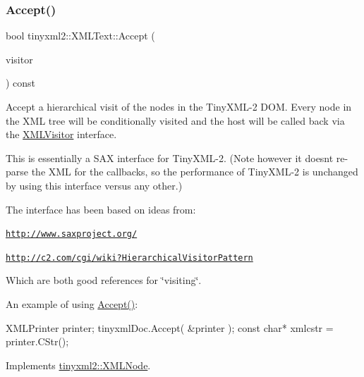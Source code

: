 \subsubsection{\texorpdfstring{Accept()}{Accept()}}
{\footnotesize\ttfamily bool tinyxml2\+::\+X\+M\+L\+Text\+::\+Accept (\begin{DoxyParamCaption}\item[{\hyperlink{classtinyxml2_1_1_x_m_l_visitor}{X\+M\+L\+Visitor} $\ast$}]{visitor }\end{DoxyParamCaption}) const\hspace{0.3cm}{\ttfamily [virtual]}}

Accept a hierarchical visit of the nodes in the Tiny\+X\+M\+L-\/2 D\+OM. Every node in the X\+ML tree will be conditionally visited and the host will be called back via the \hyperlink{classtinyxml2_1_1_x_m_l_visitor}{X\+M\+L\+Visitor} interface.

This is essentially a S\+AX interface for Tiny\+X\+M\+L-\/2. (Note however it doesn\textquotesingle{}t re-\/parse the X\+ML for the callbacks, so the performance of Tiny\+X\+M\+L-\/2 is unchanged by using this interface versus any other.)

The interface has been based on ideas from\+:


\begin{DoxyItemize}
\item \href{http://www.saxproject.org/}{\tt http\+://www.\+saxproject.\+org/}
\item \href{http://c2.com/cgi/wiki?HierarchicalVisitorPattern}{\tt http\+://c2.\+com/cgi/wiki?\+Hierarchical\+Visitor\+Pattern}
\end{DoxyItemize}

Which are both good references for \char`\"{}visiting\char`\"{}.

An example of using \hyperlink{classtinyxml2_1_1_x_m_l_text_a537c60d7e18fb59c45ac2737a29ac47a}{Accept()}\+: \begin{DoxyVerb}XMLPrinter printer;
tinyxmlDoc.Accept( &printer );
const char* xmlcstr = printer.CStr();
\end{DoxyVerb}
 

Implements \hyperlink{classtinyxml2_1_1_x_m_l_node_a81e66df0a44c67a7af17f3b77a152785}{tinyxml2\+::\+X\+M\+L\+Node}.

\mbox{\label{classtinyxml2_1_1_x_m_l_text_ac1bb5ea4166c320882d9e0ad16fd385b}} 
